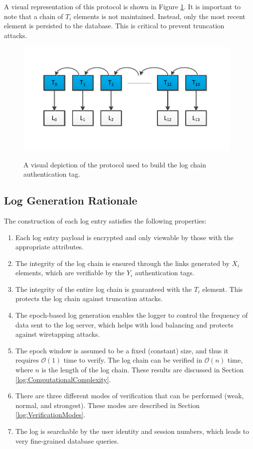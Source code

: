 \documentclass{sig-alternate}
\begin{document}
A visual representation of this protocol is shown in Figure \ref{fig:tagChain}. It is
important to note that a chain of $T_i$ elements is not maintained. Instead, only the
most recent element is persisted to the database. This is critical to prevent
truncation attacks.

\begin{figure}[ht!]
  \centering
  \includegraphics[scale=0.8]{images/tagchain.pdf} \\
\caption{A visual depiction of the protocol used to build the log chain authentication tag.}
\label{fig:tagChain}
\end{figure}

\subsection{Log Generation Rationale}
The construction of each log entry satisfies the following properties:
\begin{enumerate}
	\item Each log entry payload is encrypted and only viewable by those with the appropriate attributes.
	\item The integrity of the log chain is ensured through the links generated by $X_i$ elements, which are verifiable by the $Y_i$ authentication tags.
	\item The integrity of the entire log chain is guaranteed with the $T_i$ element. This protects the log chain against truncation attacks.
	\item The epoch-based log generation enables the logger to control the frequency of data
	sent to the log server, which helps with load balancing and protects against wiretapping attacks.
	\item The epoch window is assumed to be a fixed (constant) size, and thus it requires $\mathcal{O}(1)$ time to verify. The log chain can be verified in $\mathcal{O}(n)$ time, where $n$ is the length of the log chain. These results are discussed in Section \ref{log:ComputationalComplexity}.
	\item There are three different modes of verification that can be performed (weak, normal, and strongest). These modes are described in Section \ref{log:VerificationModes}.
	\item The log is searchable by the user identity and session numbers, which leads to very fine-grained database queries. 
\end{enumerate}
\end{document}
